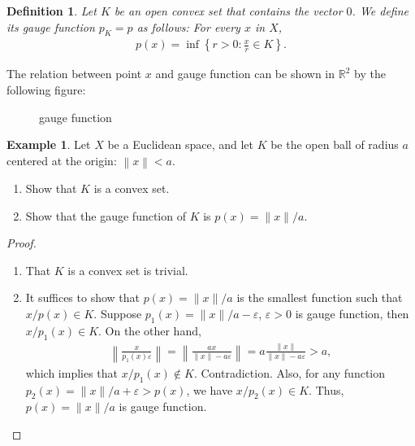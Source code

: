 \documentclass[10pt]{book}
\newtheorem{definition}{Definition}[chapter]
\theoremstyle{definition}
\newtheorem{example}{Example}[chapter]
\numberwithin{equation}{chapter}
\begin{document}
\medskip

\begin{definition}\label{gauge_function_def}
Let $K$ be an open convex set that contains the vector $0$. We define its gauge function $p_K = p$ as follows: For every $x$ in $X$, 
\begin{align*}
    p(x) = \inf \left\{r > 0 : \frac{x}{r} \in K\right\}.
\end{align*}
\end{definition}
The relation between point $x$ and gauge function can be shown in $\mathbb{R}^2$ by the following figure: \\
\begin{figure}[h]
    \centering
    \caption{gauge function}
    \label{fig:plot_3}
\end{figure}

\medskip

\begin{example}
Let $X$ be a Euclidean space, and let $K$ be the open ball of radius $a$ centered at the origin: $\left\|x\right\| < a$.
\begin{enumerate}[label=(\arabic*)]
    \item Show that $K$ is a convex set.
    
    \item Show that the gauge function of $K$ is $p(x) = \|x\|/a$.
\end{enumerate}
\end{example}
\begin{proof}
~\begin{enumerate}[label=(\arabic*)]
    \item That $K$ is a convex set is trivial.
    
    \item It suffices to show that $p(x) = \|x\|/a$ is the smallest function such that $x/p(x) \in K$. Suppose $p_1(x) = \|x\|/a - \varepsilon$, $\varepsilon > 0$ is gauge function, then $x/p_1(x) \in K$. On the other hand,
    \begin{align*}
        \left\|\frac{x}{p_1(x) \varepsilon} \right\| = \left\|\frac{ax}{\|x\| - a \varepsilon} \right\| = a \frac{\|x\|}{\|x\| - a \varepsilon} > a,
    \end{align*}
    which implies that $x/p_1(x) \notin K$. Contradiction. 
    Also, for any function $p_2(x) = \|x\|/a + \varepsilon > p(x)$, we have $x/p_2(x) \in K$. Thus, $p(x) = \|x\|/a$ is gauge function.
\end{enumerate}
\end{proof}
\end{document}
